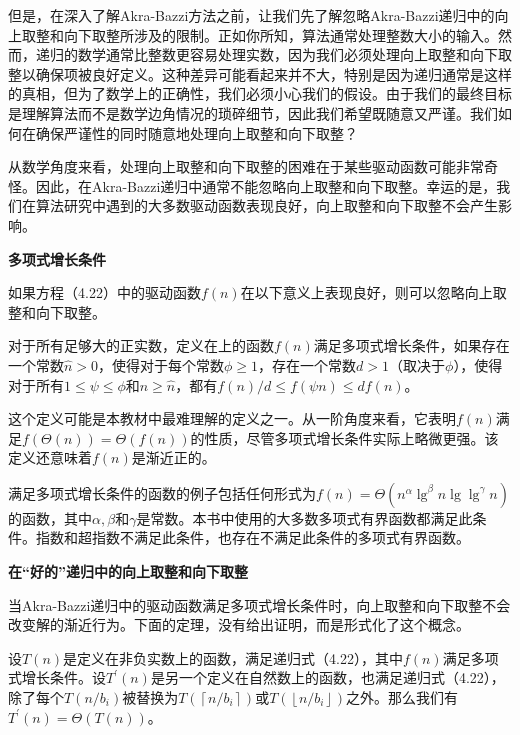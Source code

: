 \documentclass[lang=cn,newtx,10pt,scheme=chinese]{elegantbook}
\begin{document}
但是，在深入了解Akra-Bazzi方法之前，让我们先了解忽略Akra-Bazzi递归中的向上取整和向下取整所涉及的限制。正如你所知，算法通常处理整数大小的输入。然而，递归的数学通常比整数更容易处理实数，因为我们必须处理向上取整和向下取整以确保项被良好定义。这种差异可能看起来并不大，特别是因为递归通常是这样的真相，但为了数学上的正确性，我们必须小心我们的假设。由于我们的最终目标是理解算法而不是数学边角情况的琐碎细节，因此我们希望既随意又严谨。我们如何在确保严谨性的同时随意地处理向上取整和向下取整？

从数学角度来看，处理向上取整和向下取整的困难在于某些驱动函数可能非常奇怪。因此，在Akra-Bazzi递归中通常不能忽略向上取整和向下取整。幸运的是，我们在算法研究中遇到的大多数驱动函数表现良好，向上取整和向下取整不会产生影响。

\textbf{多项式增长条件}

如果方程（4.22）中的驱动函数$f(n)$在以下意义上表现良好，则可以忽略向上取整和向下取整。

\begin{tcolorbox}
对于所有足够大的正实数，定义在上的函数$f(n)$满足多项式增长条件，如果存在一个常数$\hat{n}>0$，使得对于每个常数$\phi \geq 1$，存在一个常数$d>1$（取决于$\phi$），使得对于所有$1 \leq \psi \leq \phi$和$n \geq \hat{n}$，都有$f(n) / d \leq f(\psi n) \leq d f(n)$。
\end{tcolorbox}

这个定义可能是本教材中最难理解的定义之一。从一阶角度来看，它表明$f(n)$满足$f(\Theta(n))=\Theta(f(n))$的性质，尽管多项式增长条件实际上略微更强。该定义还意味着$f(n)$是渐近正的。

满足多项式增长条件的函数的例子包括任何形式为$f(n)=\Theta\left(n^\alpha \lg ^\beta n \lg \lg ^\gamma n\right)$的函数，其中$\alpha, \beta$和$\gamma$是常数。本书中使用的大多数多项式有界函数都满足此条件。指数和超指数不满足此条件，也存在不满足此条件的多项式有界函数。

\textbf{在``好的''递归中的向上取整和向下取整}

当Akra-Bazzi递归中的驱动函数满足多项式增长条件时，向上取整和向下取整不会改变解的渐近行为。下面的定理，没有给出证明，而是形式化了这个概念。

\begin{theorem}{}{}
设$T(n)$是定义在非负实数上的函数，满足递归式（4.22），其中$f(n)$满足多项式增长条件。设$T^{\prime}(n)$是另一个定义在自然数上的函数，也满足递归式（4.22），除了每个$T\left(n / b_i\right)$被替换为$T\left(\left\lceil n / b_i\right\rceil\right)$或$T\left(\left\lfloor n / b_i\right\rfloor\right)$之外。那么我们有$T^{\prime}(n)=\Theta(T(n))$。
\end{theorem}
\end{document}
